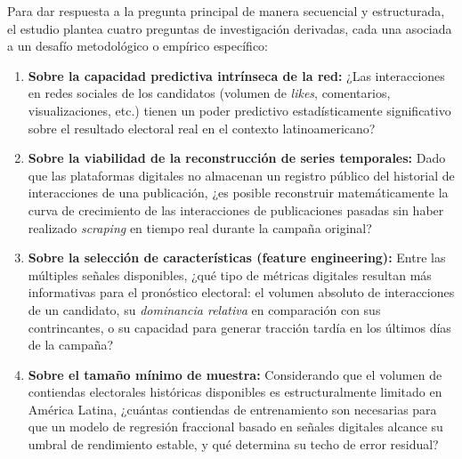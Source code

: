 Para dar respuesta a la pregunta principal de manera secuencial y estructurada, el estudio plantea cuatro preguntas de investigación derivadas, cada una asociada a un desafío metodológico o empírico específico:

\begin{enumerate}
    \item \textbf{Sobre la capacidad predictiva intrínseca de la red:} ¿Las interacciones en redes sociales de los candidatos (volumen de \textit{likes}, comentarios, visualizaciones, etc.) tienen un poder predictivo estadísticamente significativo sobre el resultado electoral real en el contexto latinoamericano?
    \item \textbf{Sobre la viabilidad de la reconstrucción de series temporales:} Dado que las plataformas digitales no almacenan un registro público del historial de interacciones de una publicación, ¿es posible reconstruir matemáticamente la curva de crecimiento de las interacciones de publicaciones pasadas sin haber realizado \textit{scraping} en tiempo real durante la campaña original?
    \item \textbf{Sobre la selección de características (feature engineering):} Entre las múltiples señales disponibles, ¿qué tipo de métricas digitales resultan más informativas para el pronóstico electoral: el volumen absoluto de interacciones de un candidato, su \textit{dominancia relativa} en comparación con sus contrincantes, o su capacidad para generar tracción tardía en los últimos días de la campaña?
    \item \textbf{Sobre el tamaño mínimo de muestra:} Considerando que el volumen de contiendas electorales históricas disponibles es estructuralmente limitado en América Latina, ¿cuántas contiendas de entrenamiento son necesarias para que un modelo de regresión fraccional basado en señales digitales alcance su umbral de rendimiento estable, y qué determina su techo de error residual?
\end{enumerate}
